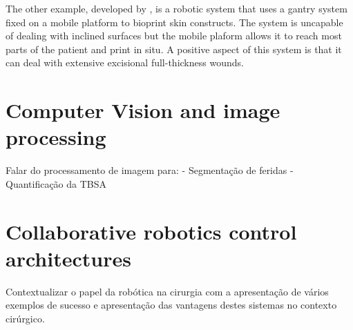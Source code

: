 The other example, developed by \citeauthor{Albanna2019_in_situ_bioprinting_mobile_gantry}\cite{Albanna2019_in_situ_bioprinting_mobile_gantry}, is a robotic system that uses a gantry system fixed on a mobile platform to bioprint skin constructs. The system is uncapable of dealing with inclined surfaces but the mobile plaform allows it to reach most parts of the patient and print in situ. A positive aspect of this system is that it can deal with extensive excisional full-thickness wounds.


\section{Computer Vision and image processing}
\label{sec:computer_vision_and_image_processing}

Falar do processamento de imagem para:
- Segmentação de feridas
- Quantificação da TBSA


\section{Collaborative robotics control architectures}
\label{sec:collaborative_robotics_control_architectures}

Contextualizar o papel da robótica na cirurgia com a apresentação de vários exemplos de sucesso e apresentação das vantagens destes sistemas no contexto cirúrgico.

